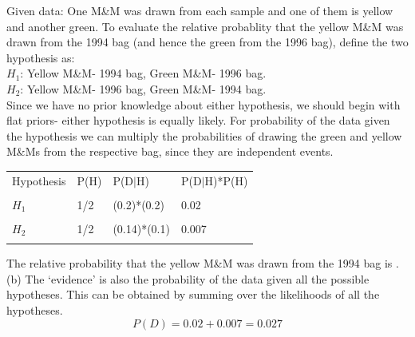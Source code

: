 \documentclass[12pt,usletter,english]{article}
\begin{document}
Given data: One M\&M was drawn from each sample and one of them is
yellow and another green. To evaluate the relative probablity that the
yellow M\&M was drawn from the 1994 bag (and hence the green from the
1996 bag), define the two hypothesis as:\\

\noindent$H_1$: Yellow M\&M- 1994 bag, Green M\&M- 1996 bag.\\

\noindent$H_2$: Yellow M\&M- 1996 bag, Green M\&M- 1994 bag.\\

Since we have no prior knowledge about either hypothesis, we should
begin with flat priors- either hypothesis is equally likely. For
probability of the data given the hypothesis we can multiply the
probabilities of drawing the green and yellow M\&Ms from the
respective bag, since they are independent events.

\begin{center}
\begin{tabular}{|l|l|l|l|}
\hline
Hypothesis & P(H) & P(D$|$H) & P(D$|$H)*P(H) \\
 & & & \\
\hline
$H_1$ & 1/2 & (0.2)*(0.2) & 0.02 \\
 & & & \\
\hline
$H_2$ & 1/2 & (0.14)*(0.1) & 0.007 \\
 & & & \\
\hline
\end{tabular}
\end{center}

The relative probability that the yellow M\&M was drawn from the 1994
bag is .\\

\noindent(b) The `evidence' is also the probability of the data given
all the possible hypotheses. This can be obtained by summing over the
likelihoods of all the hypotheses.
\begin{equation}
  P(D) = 0.02+0.007 = 0.027
\end{equation}
\end{document}
